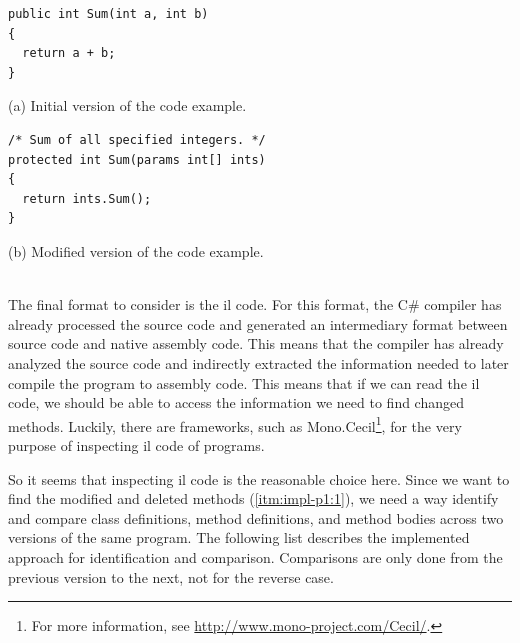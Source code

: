 \documentclass[a4paper,english,12pt]{report}
\begin{document}
\begingroup
\captionsetup{type=listing}
\begin{multicols}{2}
\noindent
{\footnotesize
\begin{verbatim}
public int Sum(int a, int b)
{
  return a + b;
}
\end{verbatim}
(a) Initial version of the code example.
}

\columnbreak
\noindent
{\footnotesize
\begin{verbatim}
/* Sum of all specified integers. */
protected int Sum(params int[] ints)
{
  return ints.Sum();
}
\end{verbatim}
(b) Modified version of the code example.
}
\end{multicols}
\label{lst:difficult}
\endgroup

\ \\\indent The final format to consider is the \gls{il} code. For this format, the C\# compiler has already processed the source code and generated an intermediary format between source code and native assembly code. This means that the compiler has already analyzed the source code and indirectly extracted the information needed to later compile the program to assembly code. This means that if we can read the \gls{il} code, we should be able to access the information we need to find changed methods. Luckily, there are frameworks, such as Mono.Cecil\footnote{For more information, see \url{http://www.mono-project.com/Cecil/}.}, for the very purpose of inspecting \gls{il} code of programs.

So it seems that inspecting \gls{il} code is the reasonable choice here. Since we want to find the modified and deleted methods (\ref{itm:impl-p1:1}), we need a way identify and compare class definitions, method definitions, and method bodies across two versions of the same program. The following list describes the implemented approach for identification and comparison. Comparisons are only done from the previous version to the next, not for the reverse case.
\end{document}
